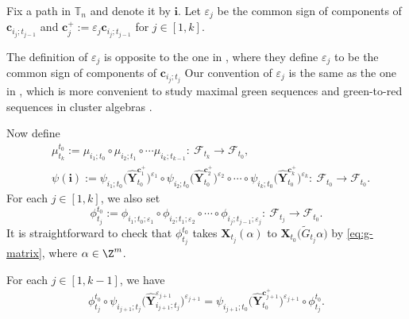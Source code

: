 Fix a path  in $\mathbb{T}_n$ and denote it by $\mathbf{i}$. Let $\varepsilon_{j}$ be the common sign of components of $\mathbf{c}_{i_j;t_{j-1}}$ and $\mathbf{c}_{j}^{+}:=\varepsilon_{j}\mathbf{c}_{i_j;t_{j-1}}$ for $j\in[1,k]$.
\begin{Remark}
 The definition of $\varepsilon_j$ is opposite to the one in \cite{LMN2023}, where they define $\varepsilon_j$ to be the common sign of components of $\mathbf{c}_{i_j;t_j}$
 Our convention of $\varepsilon_{j}$ is the same as the one in \cite{Keller2012}, which is more convenient to study maximal green sequences and green-to-red sequences in cluster algebras \cite{KD2020}.
\end{Remark}
Now define
\begin{align*}
&\mu_{t_k}^{t_0}:=\mu_{i_1;t_0}\circ\mu_{i_2;t_1}\circ\cdots\mu_{i_k;t_{k-1}}\colon\ \mathcal{F}_{t_k}\to\mathcal{F}_{t_0},\\
&\psi(\mathbf{i}):=\psi_{i_1;t_0}\bigl(\mathbf{\hat{Y}}_{t_0}^{\mathbf{c}_{1}^+}\bigr)^{\varepsilon_1}\circ\psi_{i_2;t_0}\bigl(\mathbf{\hat{Y}}_{t_0}^{\mathbf{c}_{2}^+}\bigr)^{\varepsilon_2}\circ\cdots\circ\psi_{i_k;t_0}\bigl(\mathbf{\hat{Y}}_{t_0}^{\mathbf{c}_{k}^+}\bigr)^{\varepsilon_k}\colon\ \mathcal{F}_{t_0}\to\mathcal{F}_{t_0}.
\end{align*}
For each $j\in [1,k]$, we also set
\[
\phi_{t_{j}}^{t_0}:=\phi_{i_1;t_{0};\varepsilon_{1}}\circ\phi_{i_2;t_{1};\varepsilon_{2}}\circ\cdots\circ\phi_{i_j;t_{j-1};\varepsilon_{j}}\colon\ \mathcal{F}_{t_{j}}\to\mathcal{F}_{t_{0}}.
\]
It is straightforward to check that $\phi_{t_{j}}^{t_0}$ takes $\mathbf{X}_{t_{j}}(\alpha)$ to $\mathbf{X}_{t_{0}}\bigl(\tilde{G}_{t_{j}}\alpha\bigr)$ by \eqref{eq:g-matrix}, where $\alpha\in \Z^m$.
\begin{Lemma}\label{l:commutative-diag-isom}
 For each $j\in [1,k-1]$, we have
\[
 \phi_{t_{j}}^{t_{0}}\circ\psi_{i_{j+1};t_{j}}\bigl(\mathbf{\hat{Y}}^{\varepsilon_{j+1}}_{i_{j+1};t_{j}}\bigr)^{\varepsilon_{j+1}}
 =\psi_{i_{j+1};t_{0}}\bigl(\mathbf{\hat{Y}}_{t_{0}}^{\mathbf{c}_{j+1}^{+}}\bigr)^{\varepsilon_{j+1}}\circ\phi_{t_{j}}^{t_{0}}.
 \]
\end{Lemma}
